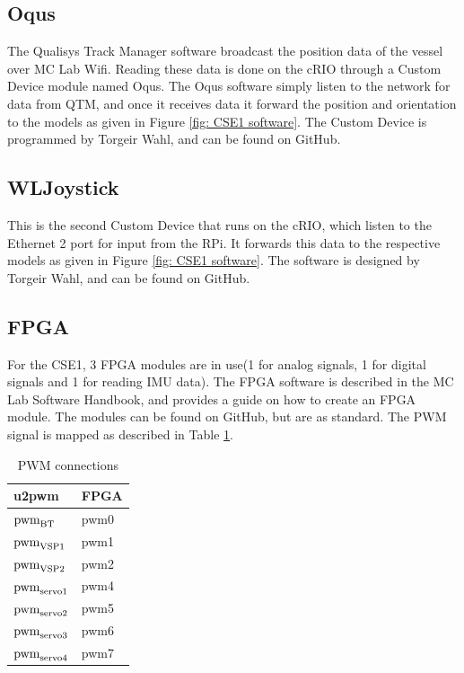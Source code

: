 \subsection{Oqus}
The Qualisys Track Manager software broadcast the position data of the vessel over MC Lab Wifi. Reading these data is done on the cRIO through a Custom Device module named Oqus. The Oqus software simply listen to the network for data from QTM, and once it receives data it forward the position and orientation to the models as given in Figure \ref{fig: CSE1 software}. The Custom Device is programmed by Torgeir Wahl, and can be found on GitHub. 
\subsection{WL\textunderscore Joystick}
This is the second Custom Device that runs on the cRIO, which listen to the Ethernet 2 port for input from the RPi. It forwards this data to the respective models as given in Figure \ref{fig: CSE1 software}. The software is designed by Torgeir Wahl, and can be found on GitHub. 
\subsection{FPGA}\label{sec:FPGA}
For the CSE1, 3 FPGA modules are in use(1 for analog signals, 1 for digital signals and 1 for reading IMU data). The FPGA software is described in the MC Lab Software Handbook, and provides a guide on how to create an FPGA module. The modules can be found on GitHub, but are as standard. The PWM signal is mapped as described in Table \ref{tab:cRIO-actuator}.
\begin{table}[h!]
	\caption{PWM connections}
	\begin{centering}
		\begin{tabular}{ll}
			\toprule 
			\multicolumn{1}{l}{u2pwm} & FPGA\tabularnewline
			\midrule 
			$\text{\text{pwm}}_{\text{BT}}$ & pwm0\tabularnewline
			$\text{\text{pwm}}_{\text{VSP1}}$ & pwm1\tabularnewline
			$\text{\text{pwm}}_{\text{VSP2}}$ & pwm2\tabularnewline
			$\text{\text{pwm}}_{\text{servo1}}$ & pwm4\tabularnewline
			$\text{\text{pwm}}_{\text{servo2}}$ & pwm5\tabularnewline
			$\text{\text{pwm}}_{\text{servo3}}$ & pwm6\tabularnewline
			$\text{\text{pwm}}_{\text{servo4}}$ & pwm7\tabularnewline
			\bottomrule
		\end{tabular}
		\par\end{centering}
	\centering{}\label{tab:cRIO-actuator} 
\end{table}
